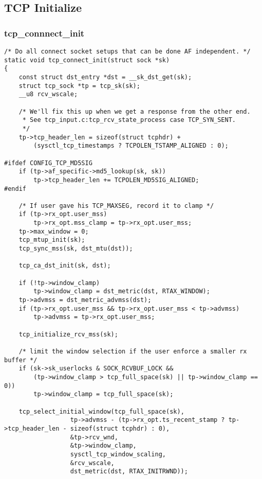     \subsection{TCP Initialize}
        \subsubsection{tcp\_connnect\_init}
            \label{TCPInitialize:tcp_connect_init}
\begin{verbatim}
/* Do all connect socket setups that can be done AF independent. */
static void tcp_connect_init(struct sock *sk)
{
    const struct dst_entry *dst = __sk_dst_get(sk);
    struct tcp_sock *tp = tcp_sk(sk);
    __u8 rcv_wscale;

    /* We'll fix this up when we get a response from the other end.
     * See tcp_input.c:tcp_rcv_state_process case TCP_SYN_SENT.
     */
    tp->tcp_header_len = sizeof(struct tcphdr) +
        (sysctl_tcp_timestamps ? TCPOLEN_TSTAMP_ALIGNED : 0);

#ifdef CONFIG_TCP_MD5SIG
    if (tp->af_specific->md5_lookup(sk, sk))
        tp->tcp_header_len += TCPOLEN_MD5SIG_ALIGNED;
#endif

    /* If user gave his TCP_MAXSEG, record it to clamp */
    if (tp->rx_opt.user_mss)
        tp->rx_opt.mss_clamp = tp->rx_opt.user_mss;
    tp->max_window = 0;
    tcp_mtup_init(sk);
    tcp_sync_mss(sk, dst_mtu(dst));

    tcp_ca_dst_init(sk, dst);

    if (!tp->window_clamp)
        tp->window_clamp = dst_metric(dst, RTAX_WINDOW);
    tp->advmss = dst_metric_advmss(dst);
    if (tp->rx_opt.user_mss && tp->rx_opt.user_mss < tp->advmss)
        tp->advmss = tp->rx_opt.user_mss;

    tcp_initialize_rcv_mss(sk);

    /* limit the window selection if the user enforce a smaller rx buffer */
    if (sk->sk_userlocks & SOCK_RCVBUF_LOCK &&
        (tp->window_clamp > tcp_full_space(sk) || tp->window_clamp == 0))
        tp->window_clamp = tcp_full_space(sk);

    tcp_select_initial_window(tcp_full_space(sk),
                  tp->advmss - (tp->rx_opt.ts_recent_stamp ? tp->tcp_header_len - sizeof(struct tcphdr) : 0),
                  &tp->rcv_wnd,
                  &tp->window_clamp,
                  sysctl_tcp_window_scaling,
                  &rcv_wscale,
                  dst_metric(dst, RTAX_INITRWND));


\end{verbatim}

